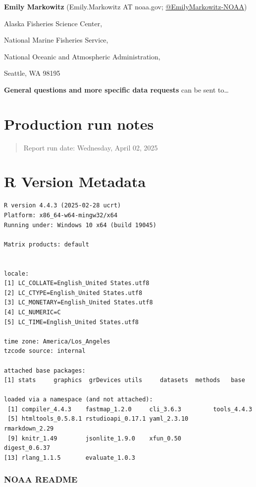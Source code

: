 \documentclass[
  letterpaper,
  oneside,
  open=any]{scrbook}
\begin{document}

\textbf{Emily Markowitz} (Emily.Markowitz AT noaa.gov;
\href{https://github.com/EmilyMarkowitz-NOAA}{@EmilyMarkowitz-NOAA})

Alaska Fisheries Science Center,

National Marine Fisheries Service,

National Oceanic and Atmospheric Administration,

Seattle, WA 98195

\textbf{General questions and more specific data requests} can be sent
to\ldots{}

\chapter{Production run notes}\label{production-run-notes}

\begin{quote}
Report run date: Wednesday, April 02, 2025
\end{quote}

\chapter{R Version Metadata}\label{r-version-metadata}

\begin{verbatim}
R version 4.4.3 (2025-02-28 ucrt)
Platform: x86_64-w64-mingw32/x64
Running under: Windows 10 x64 (build 19045)

Matrix products: default


locale:
[1] LC_COLLATE=English_United States.utf8 
[2] LC_CTYPE=English_United States.utf8   
[3] LC_MONETARY=English_United States.utf8
[4] LC_NUMERIC=C                          
[5] LC_TIME=English_United States.utf8    

time zone: America/Los_Angeles
tzcode source: internal

attached base packages:
[1] stats     graphics  grDevices utils     datasets  methods   base     

loaded via a namespace (and not attached):
 [1] compiler_4.4.3    fastmap_1.2.0     cli_3.6.3         tools_4.4.3      
 [5] htmltools_0.5.8.1 rstudioapi_0.17.1 yaml_2.3.10       rmarkdown_2.29   
 [9] knitr_1.49        jsonlite_1.9.0    xfun_0.50         digest_0.6.37    
[13] rlang_1.1.5       evaluate_1.0.3   
\end{verbatim}

\subsection{NOAA README}\label{noaa-readme-1}
\end{document}
